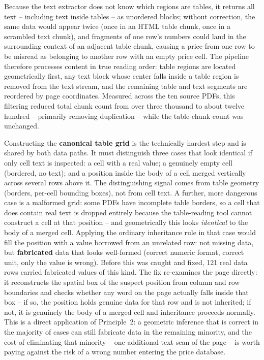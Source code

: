 \documentclass[11pt,a4paper]{article}
\begin{document}
Because the text extractor does not know which regions are tables, it
returns all text -- including text inside tables -- as unordered blocks;
without correction, the same data would appear twice (once in an HTML table
chunk, once in a scrambled text chunk), and fragments of one row's numbers
could land in the surrounding context of an adjacent table chunk, causing a
price from one row to be misread as belonging to another row with an empty
price cell. The pipeline therefore processes content in true reading order:
table regions are located geometrically first, any text block whose center
falls inside a table region is removed from the text stream, and the
remaining table and text segments are reordered by page coordinates.
Measured across the ten source PDFs, this filtering reduced total chunk
count from over three thousand to about twelve hundred -- primarily removing
duplication -- while the table-chunk count was unchanged.

Constructing the \textbf{canonical table grid} is the technically hardest
step and is shared by both data paths. It must distinguish three cases that
look identical if only cell text is inspected: a cell with a real value; a
genuinely empty cell (bordered, no text); and a position inside the body of
a cell merged vertically across several rows above it. The distinguishing
signal comes from table geometry (borders, per-cell bounding boxes), not
from cell text. A further, more dangerous case is a malformed grid: some
PDFs have incomplete table borders, so a cell that does contain real text is
dropped entirely because the table-reading tool cannot construct a cell at
that position -- and geometrically this looks \emph{identical} to the body
of a merged cell. Applying the ordinary inheritance rule in that case would
fill the position with a value borrowed from an unrelated row: not missing
data, but \textbf{fabricated} data that looks well-formed (correct numeric
format, correct unit, only the value is wrong). Before this was caught and
fixed, 121 real data rows carried fabricated values of this kind. The fix
re-examines the page directly: it reconstructs the spatial box of the
suspect position from column and row boundaries and checks whether any word
on the page actually falls inside that box -- if so, the position holds
genuine data for that row and is not inherited; if not, it is genuinely the
body of a merged cell and inheritance proceeds normally. This is a direct
application of Principle~2: a geometric inference that is correct in the
majority of cases can still fabricate data in the remaining minority, and
the cost of eliminating that minority -- one additional text scan of the
page -- is worth paying against the risk of a wrong number entering the
price database.
\end{document}
